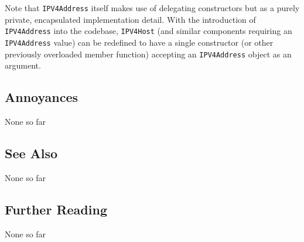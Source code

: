 \noindent Note that \texttt{IPV4Address} itself makes use of delegating
constructors but as a purely private, encapsulated implementation
detail. With the introduction of \texttt{IPV4Address} into the codebase,
\texttt{IPV4Host} (and similar components requiring an
\texttt{IPV4Address} value) can be redefined to have a single
constructor (or other previously overloaded member function) accepting
an \texttt{IPV4Address} object as an argument.

\subsection[Annoyances]{Annoyances}\label{annoyances}

None so far

\subsection[See Also]{See Also}\label{see-also}

None so far

\subsection[Further Reading]{Further Reading}\label{further-reading}

None so far



